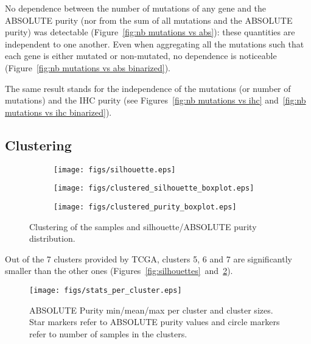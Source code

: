 \documentclass[letterpaper]{article}
\begin{document}
No dependence between the number of mutations of any gene and the ABSOLUTE purity (nor from the sum of all mutations and the ABSOLUTE purity) was detectable
(Figure~\ref{fig:nb mutations vs abs}): these quantities are independent to one another. Even when aggregating all the mutations such that each gene is either
mutated or non-mutated, no dependence is noticeable (Figure~\ref{fig:nb mutations vs abs binarized}).

The same result stands for the independence of the mutations (or number of mutations) and the IHC purity (see Figures~\ref{fig:nb mutations vs ihc}
and~\ref{fig:nb mutations vs ihc binarized}).

\subsection{Clustering}

\begin{figure}
\begin{subfigure}{.5\textwidth}
\hspace{-.5cm}
\texttt{[image: figs/silhouette.eps]}
\end{subfigure}
\begin{subfigure}{.5\textwidth}
\hspace{-.5cm}
\texttt{[image: figs/clustered\_silhouette\_boxplot.eps]}
\end{subfigure}
\begin{subfigure}{.5\textwidth}
\hspace{-.5cm}
\texttt{[image: figs/clustered\_purity\_boxplot.eps]}
\end{subfigure}
\caption{Clustering of the samples and silhouette/ABSOLUTE purity distribution.\label{fig:clustering}}
\end{figure}

Out of the 7 clusters provided by TCGA, clusters 5, 6 and 7 are significantly smaller than the other ones (Figures~\ref{fig:silhouettes}~and~\ref{fig:stats clusters}).

\begin{figure}[!h]
\texttt{[image: figs/stats\_per\_cluster.eps]}
\caption{ABSOLUTE Purity min/mean/max per cluster and cluster sizes. Star markers refer to ABSOLUTE purity values and circle markers refer to number
of samples in the clusters.\label{fig:stats clusters}}
\end{figure}
\end{document}
